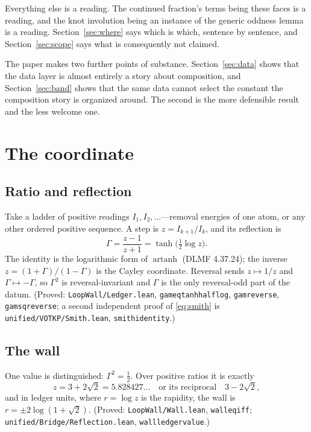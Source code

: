 \documentclass[11pt]{article}
\newcommand{\G}{\Gamma}
\renewcommand{\_}{\origunderscore\allowbreak}
\newcommand{\W}{3+2\sqrt{2}}
\begin{document}
Everything else is a reading. The continued fraction's terms being these faces is a reading, and
the knot involution being an instance of the generic oddness lemma is a reading. Section~\ref{sec:where}
says which is which, sentence by sentence, and Section~\ref{sec:scope} says what is consequently
not claimed.

The paper makes two further points of substance. Section~\ref{sec:data} shows that the data layer
is almost entirely a story about composition, and Section~\ref{sec:band} shows that the same data
cannot select the constant the composition story is organized around. The second is the more
defensible result and the less welcome one.

\section{The coordinate}

\subsection{Ratio and reflection}

Take a ladder of positive readings $I_1,I_2,\dots$---removal energies of one atom, or any other
ordered positive sequence. A step is $z=I_{k+1}/I_k$, and its reflection is
\begin{equation}
\G=\frac{z-1}{z+1}=\tanh\!\Big(\tfrac12\log z\Big). \label{eq:smith}
\end{equation}
The identity is the logarithmic form of $\operatorname{artanh}$ (DLMF 4.37.24); the inverse
$z=(1+\G)/(1-\G)$ is the Cayley coordinate. Reversal sends $z\mapsto 1/z$ and $\G\mapsto-\G$, so
$\G^2$ is reversal-invariant and $\G$ is the only reversal-odd part of the datum.
(Proved: \texttt{LoopWall/Ledger.lean}, \texttt{gam\_eq\_tanh\_half\_log},
\texttt{gam\_reverse}, \texttt{gam\_sq\_reverse}; a second independent proof of
\eqref{eq:smith} is \texttt{unified/VOTKP/Smith.lean}, \texttt{smith\_identity}.)

\subsection{The wall}

One value is distinguished: $\G^2=\tfrac12$. Over positive ratios it is exactly
\begin{equation}
z=\W=5.828427\ldots \quad\text{or its reciprocal}\quad 3-2\sqrt2,
\end{equation}
and in ledger units, where $r=\log z$ is the rapidity, the wall is $r=\pm 2\log(1+\sqrt2)$.
(Proved: \texttt{LoopWall/Wall.lean}, \texttt{wall\_eq\_iff};
\texttt{unified/Bridge/Reflection.lean}, \texttt{wall\_ledger\_value}.)
\end{document}
